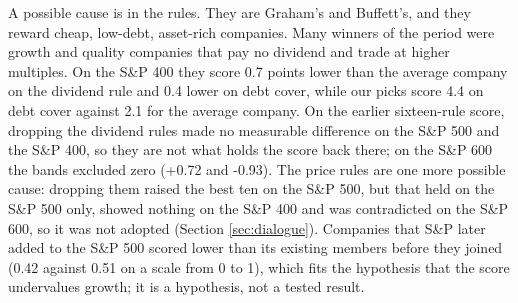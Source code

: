 \documentclass[11pt,a4paper]{article}
\begin{document}
A possible cause is in the rules. They are Graham's and Buffett's, and they reward cheap, low-debt, asset-rich companies. Many winners of the period were growth and quality companies that pay no dividend and trade at higher multiples. On the S\&P 400 they score 0.7 points lower than the average company on the dividend rule and 0.4 lower on debt cover, while our picks score 4.4 on debt cover against 2.1 for the average company. On the earlier sixteen-rule score, dropping the dividend rules made no measurable difference on the S\&P 500 and the S\&P 400, so they are not what holds the score back there; on the S\&P 600 the bands excluded zero (+0.72 and -0.93). The price rules are one more possible cause: dropping them raised the best ten on the S\&P 500, but that held on the S\&P 500 only, showed nothing on the S\&P 400 and was contradicted on the S\&P 600, so it was not adopted (Section \ref{sec:dialogue}). Companies that S\&P later added to the S\&P 500 scored lower than its existing members before they joined (0.42 against 0.51 on a scale from 0 to 1), which fits the hypothesis that the score undervalues growth; it is a hypothesis, not a tested result.
\end{document}
